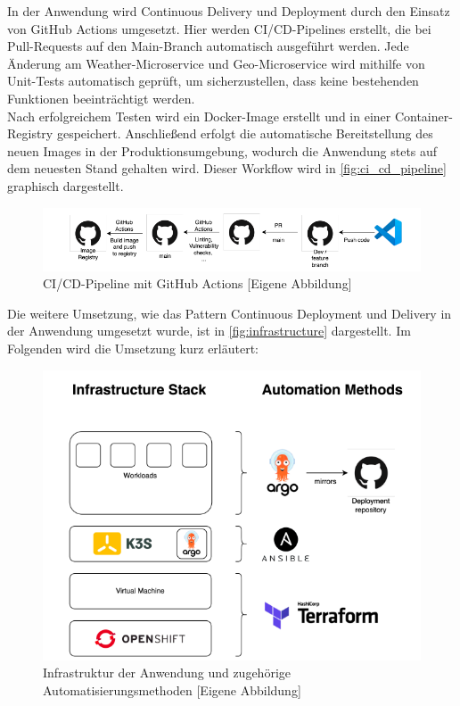 In der Anwendung wird Continuous Delivery und Deployment durch den Einsatz von GitHub Actions umgesetzt. Hier werden CI/CD-Pipelines erstellt, die bei Pull-Requests auf den Main-Branch automatisch ausgeführt werden. Jede Änderung am Weather-Microservice und Geo-Microservice wird mithilfe von Unit-Tests automatisch geprüft, um sicherzustellen, dass keine bestehenden Funktionen beeinträchtigt werden.\\
Nach erfolgreichem Testen wird ein Docker-Image erstellt und in einer Container-Registry gespeichert. Anschließend erfolgt die automatische Bereitstellung des neuen Images in der Produktionsumgebung, wodurch die Anwendung stets auf dem neuesten Stand gehalten wird. Dieser Workflow wird in \autoref{fig:ci_cd_pipeline} graphisch dargestellt. 

\begin{figure}[H]
    \centering
    \includegraphics[width=\textwidth]{img/dev_worklfow.png}
    \caption[CI/CD-Pipeline mit GitHub Actions]{CI/CD-Pipeline mit GitHub Actions [Eigene Abbildung]}
    \label{fig:ci_cd_pipeline}
\end{figure}

Die weitere Umsetzung, wie das Pattern Continuous Deployment und Delivery in der Anwendung umgesetzt wurde, ist in \autoref{fig:infrastructure} dargestellt. Im Folgenden wird die Umsetzung kurz erläutert:

\begin{figure}[H]
    \centering
    \includegraphics[width=\textwidth]{img/automation_stack.png}
    \caption[Infrastruktur der Anwendung und zugehörige Automatisierungsmethoden]{Infrastruktur der Anwendung und zugehörige Automatisierungsmethoden [Eigene Abbildung]}
    \label{fig:infrastructure}
\end{figure}

